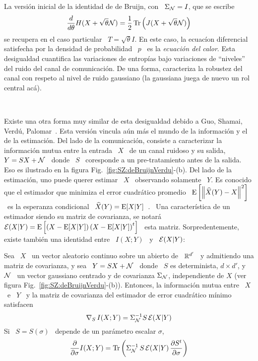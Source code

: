La versi\'on  inicial de la identidad de  de Bruijn, con \  $\Sigma_{\mathcal{N}} = I$,
que se escribe
%
\[
\frac{d}{d\theta}     H(X+\sqrt{\theta}    \mathcal{N})    =     \frac12    \operatorname{Tr}\left(
  J(X+\sqrt{\theta} \mathcal{N}) \right)
\]
%
se recupera  en el caso particular  \ $T =  \sqrt{\theta} I$.  En este  caso, la
ecuac\'ion diferencial satisfecha por la densidad  de probabilidad \ $p$ \ es la
{\it  ecuaci\'on del  calor}.  Esta  desigualdad cuantifica  las  variaciones de
entrop\'ias   bajo  variaciones   de  ``niveles''   del  ruido   del   canal  de
comunicaci\'on. De una  forma, caracteriza la robustez del  canal con respeto al
nivel de ruido gaussiano (la gaussiana juega de nuevo un rol central ac\'a).

\

Existe una  otra forma  muy similar  de esta desigualdad  debido a  Guo, Shamai,
Verd\'u,  Palomar~\cite{GuoSha05, PalVer06,  TorZoz18}.  Esta  versi\'on vincula
a\'un m\'as el mundo  de la informaci\'on y el de la  estimaci\'on.  Del lado de
la  comunicaci\'on, consiste  a  caracterizar la  informaci\'on  mutua entre  la
entrada \ $X$ \ de un canal ruidoso y su  salida, \ $Y = S X + \mathcal{N}$ \ donde \
$S$ \ coresponde a un pre-tratamiento antes de la salida. Eso es ilustrado en la
figura  Fig.~\ref{fig:SZ:deBruijnVerdu}-(b).  Del lado  de la  estimaci\'on, uno
puede querer  estimar \ $X$  \ observando solamente  \ $Y$.  Es conocido  que el
estimador  que minimiza  el error  cuadr\'atico promedio  \  $\operatorname{E}\left[ \left\|
    \widehat{X}(Y)  - X  \right\|^2 \right]$  \  es la  esperanza condicional  \
$\widehat{X}(Y)   =    \operatorname{E}[X|Y]$~\cite{Kay93,   Rob07,   LehCas98}.     \   Una
caracter\'istica de un  estimador siendo su matriz de  covarianza, se notar\'a \
$\mathcal{E}(X|Y)  =  \operatorname{E}\left[  \left( X  -  \operatorname{E}[X|Y]  \right)  \left( X  -  \operatorname{E}[X|Y]
  \right)^t  \right]$ \  esta  matriz.  Sorpredentemente,  existe tambi\'en  una
identidad entre \ $I(X;Y)$ \ y \ $\mathcal{E}(X|Y)$:
%
\begin{teorema}[Identidad de Guo--Shamai--Verd\'u]
  Sea \ $X$ \ un vector aleatorio  continuo sobre un abierto de \ $\mathbb{R}^{d'}$ \
  y admitiendo una  matriz de covarianza, y sea \  $Y = S X +  \mathcal{N}$ \ donde \
  $S$  es determinista,  $d  \times d'$,  y  \ $\mathcal{N}$  \  un vector  gaussiano
  centrado  y de covarianza  $\Sigma_{\mathcal{N}}$, independiente  de $X$  (ver figura
  Fig.~\ref{fig:SZ:deBruijnVerdu}-(b)). Entonces, la informaci\'on mutua entre \
  $X$ \ e \ $Y$ \ y  la matriz de covarianza del estimador de error cuadr\'atico
  m\'inimo satisfacen
  \[
  \nabla_S \, I(X;Y) = \Sigma_{\mathcal{N}}^{-1} S \, \mathcal{E}(X|Y)
  \]
  Si \ $S = S(\sigma)$ \ depende de un par\'ametro escalar $\sigma$,
  \[
  \frac{\partial}{\partial \sigma} I(X;Y) = \operatorname{Tr}\left( \Sigma_{\mathcal{N}}^{-1} \, S \,
    \mathcal{E}(X|Y) \, \frac{\partial S^t}{\partial \sigma} \right)
  \]
\end{teorema}
